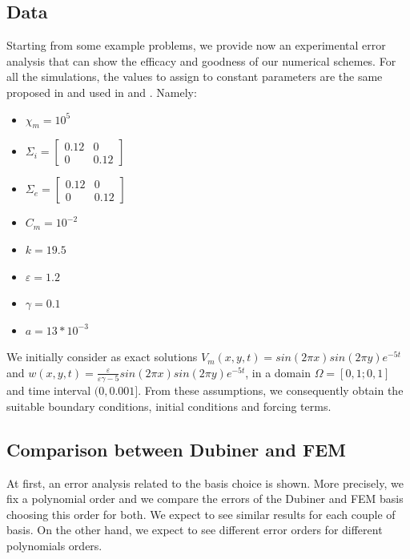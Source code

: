 \documentclass[a4paper,11pt]{article}
\begin{document}
\subsection{Data}
Starting from some example problems, we provide now an experimental error analysis that can show the efficacy and goodness of our numerical schemes. For all the simulations, the values to assign to constant parameters are the same proposed in \cite{bagnara} and used in \cite{andreotti} and \cite{marta}. Namely:
\begin{itemize}
\item $\chi_m=10^5$
\item $\Sigma_i=\begin{bmatrix} 0.12 & 0 \\ 0 & 0.12 \end{bmatrix}$
\item $\Sigma_e=\begin{bmatrix} 0.12 & 0 \\ 0 & 0.12 \end{bmatrix}$
\item $C_m=10^{-2}$
\item $k=19.5$
\item $\varepsilon=1.2$
\item $\gamma=0.1$
\item $a=13*10^{-3}$
\end{itemize}

\noindent We initially consider as exact solutions $V_m(x,y,t)=sin(2 \pi x) sin(2 \pi y) e^{-5 t}$ and $w(x,y,t)=\frac{\varepsilon}{\varepsilon \gamma-5} sin(2 \pi x) sin(2 \pi y) e^{-5 t}$, in a domain $\Omega=[0,1; 0,1]$ and time interval $(0,0.001]$. From these assumptions, we consequently obtain the suitable boundary conditions, initial conditions and forcing terms.

\subsection{Comparison between Dubiner and FEM}
At first, an error analysis related to the basis choice is shown. More precisely, we fix a polynomial order and we compare the errors of the Dubiner and FEM basis choosing this order for both. We expect to see similar results for each couple of basis. On the other hand, we expect to see different error orders for different polynomials orders.
\end{document}

